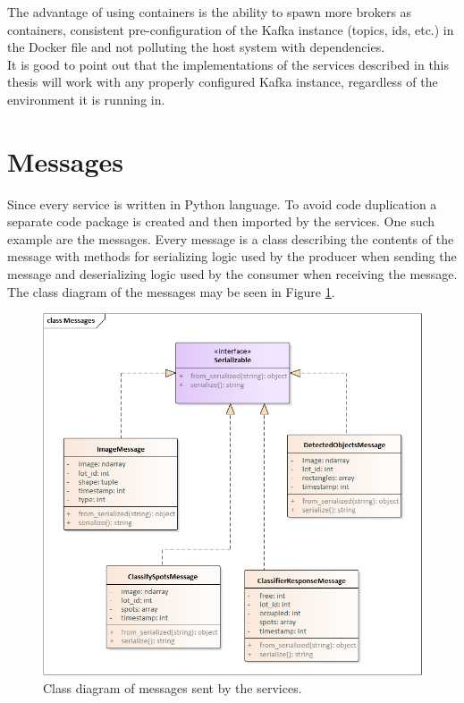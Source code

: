 \documentclass[thesis=M,english]{FITthesis}[2019/03/06]
\begin{document}
The advantage of using containers is the ability to spawn more brokers as containers, consistent pre-configuration of the Kafka instance (topics, ids, etc.) in the Docker file and not polluting the host system with dependencies.\\

It is good to point out that the implementations of the services described in this thesis will work with any properly configured Kafka instance, regardless of the environment it is running in.


\section{Messages}
Since every service is written in Python language. To avoid code duplication a separate code package is created and then imported by the services. One such example are the messages. Every message is a class describing the contents of the message with methods for serializing logic used by the producer when sending the message and deserializing logic used by the consumer when receiving the message. The class diagram of the messages may be seen in Figure \ref{label:messages_class_diagram}.

\begin{figure}[ht!]
	\centering
	\includegraphics[width=\textwidth]{imgs/messages-class-diagram.png}
	\caption{Class diagram of messages sent by the services.}
	\label{label:messages_class_diagram}
\end{figure}
\end{document}
